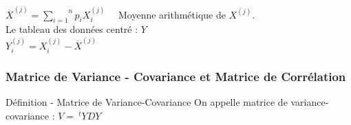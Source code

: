 \documentclass[a4paper, 12pt]{article}
\begin{document}
\begin{flushleft}
$\overline{X}^{(j)} = \overset{n}{\underset{i = 1}{\sum}} p_i X^{(j)}_{i} \quad$ Moyenne arithmétique de $X^{(j)}$. \\

Le tableau des données centré : $Y$ \\
\medskip
$\boxed{Y^{(j)}_i = X^{(j)}_i - \overline{X}^{(j)}}$
\end{flushleft}


\subsubsection{Matrice de Variance - Covariance et Matrice de Corrélation}
\begin{definition}{Définition - Matrice de Variance-Covariance}
On appelle matrice de variance-covariance : \Large $\boxed{V = \ ^tYDY}$
\end{definition}
\end{document}
